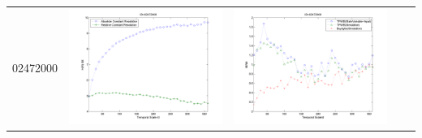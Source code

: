 \documentclass[11pt]{article}
\begin{document}
\begin{table}[H]
{\begin{tabular}{c  c   c   c c }
02472000&\begin{minipage}{.4\textwidth}\includegraphics[width=\linewidth]{resultgraph/02472000e.png}\end{minipage}
&\begin{minipage}{.4\textwidth}\includegraphics[width=\linewidth]{resultgraph/02472000MI.png}\end{minipage}

\end{tabular}}
\end{table}
\end{document}
